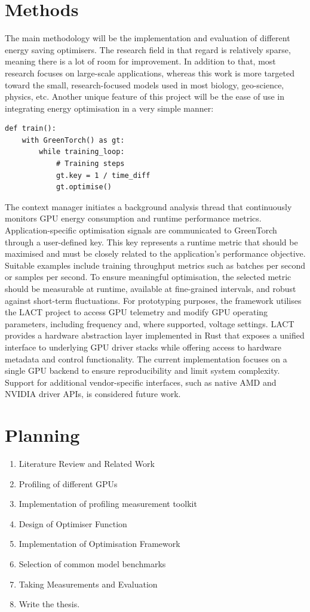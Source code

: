 \documentclass[12pt]{article}
\begin{document}
\section{Methods}
The main methodology will be the implementation and evaluation of different energy saving optimisers. The research field in that regard is relatively sparse, meaning there is a lot of room for improvement. In addition to that, most research focuses on large-scale applications, whereas this work is more targeted toward the small, research-focused models used in most biology, geo-science, physics, etc.
Another unique feature of this project will be the ease of use in integrating energy optimisation in a very simple manner:
\begin{verbatim}
def train():
    with GreenTorch() as gt:
        while training_loop:
            # Training steps
            gt.key = 1 / time_diff
            gt.optimise()
\end{verbatim}
The context manager initiates a background analysis thread that continuously monitors GPU energy consumption and runtime performance metrics.
Application-specific optimisation signals are communicated to GreenTorch through a user-defined key. This key represents a runtime metric that should be maximised and must be closely related to the application's performance objective. Suitable examples include training throughput metrics such as batches per second or samples per second.
To ensure meaningful optimisation, the selected metric should be measurable at runtime, available at fine-grained intervals, and robust against short-term fluctuations.
For prototyping purposes, the framework utilises the LACT project to access GPU telemetry and modify GPU operating parameters, including frequency and, where supported, voltage settings. LACT provides a hardware abstraction layer implemented in Rust that exposes a unified interface to underlying GPU driver stacks while offering access to hardware metadata and control functionality.
The current implementation focuses on a single GPU backend to ensure reproducibility and limit system complexity. Support for additional vendor-specific interfaces, such as native AMD and NVIDIA driver APIs, is considered future work.
\section{Planning}

\begin{enumerate}
\item Literature Review and Related Work
\item Profiling of different GPUs
\item Implementation of profiling measurement toolkit
\item Design of Optimiser Function
\item Implementation of Optimisation Framework
\item Selection of common model benchmarks
\item Taking Measurements and Evaluation
\item Write the thesis.
\end{enumerate}
\end{document}
